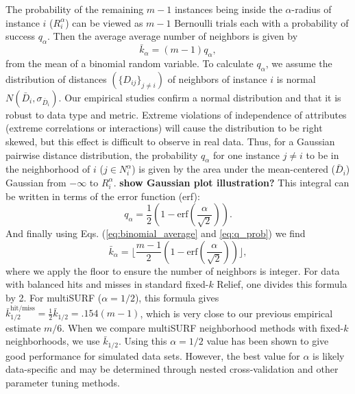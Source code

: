 \documentclass[10pt,letterpaper]{article}\usepackage[]{graphicx}\usepackage[]{color}
\begin{document}
The probability of the remaining $m-1$ instances being inside the $\alpha$-radius of instance $i$ ($R_i^{\alpha}$) can be viewed as $m-1$ Bernoulli trials each with a probability of success $q_{\alpha}$. Then the average average number of neighbors is given by
\begin{equation}
\label{eq:binomial_average}
  {\bar{k}}_{\alpha} = (m-1)q_{\alpha},
\end{equation}
from the mean of a binomial random variable. To calculate $q_{\alpha}$, we assume the distribution of distances $(\{D_{ij} \}_{j \ne i})$ of neighbors of instance $i$ is normal $N(\bar{D}_i,\sigma_{\bar{D}_i})$. Our empirical studies confirm a normal distribution and that it is robust to data type and metric. Extreme violations of independence of attributes (extreme correlations or interactions) will cause the distribution to be right skewed, but this effect is difficult to observe in real data. Thus, for a Gaussian pairwise distance distribution, the probability $q_{\alpha}$ for one instance $j \ne i$ to be in the neighborhood of $i$ ($j \in N^{\alpha}_{i}$) is given by the area under the mean-centered ($\bar{D}_i$) Gaussian from $-\infty$ to $R_i^{\alpha}$. {\bf show Gaussian plot illustration?} This integral can be written in terms of the error function (erf):
\begin{equation}
\label{eq:q_prob}
q_{\alpha} = \frac{1}{2} \left( 1 - \mathrm{erf}\left( \frac{\alpha}{\sqrt{2}} \right) \right).
\end{equation}
And finally using Eqs. (\ref{eq:binomial_average} and \ref{eq:q_prob}) we find
\begin{equation}\label{eq:kbar}
{\bar{k}}_{\alpha} = \lfloor \frac{m-1}{2}  \left( 1 - \mathrm{erf}\left( \frac{\alpha}{\sqrt{2}} \right) \right) \rfloor,
\end{equation}
where we apply the floor to ensure the number of neighbors is integer. For data with balanced hits and misses in standard fixed-$k$ Relief, one divides this formula by 2. For multiSURF ($\alpha=1/2$), this formula gives $\bar{k}_{1/2}^{\text{hit/miss}} = \frac{1}{2}\bar{k}_{1/2} = .154 (m-1)$, which is very close to our previous empirical estimate $m/6$. When we compare multiSURF neighborhood methods with fixed-$k$ neighborhoods, we use $\bar{k}_{1/2}$. Using this $\alpha=1/2$ value has been shown to give good performance for simulated data sets. However, the best value for $\alpha$ is likely data-specific and may be determined through nested cross-validation and other parameter tuning methods.
\end{document}
